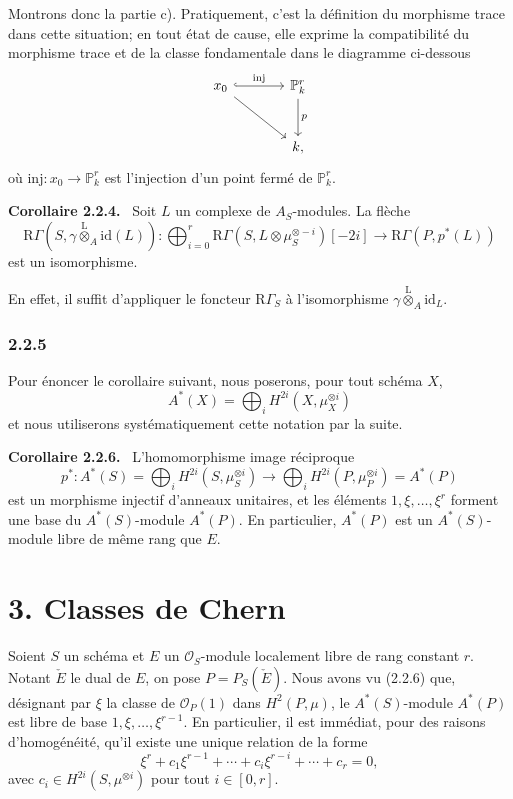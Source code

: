 \documentclass[11pt]{article}
\newenvironment{statement}[1]{\par\medskip\noindent\textbf{#1.}\ }{\par\medskip}
\providecommand{\lten}{\overset{\mathrm L}{\otimes}}
\providecommand{\lten}{\overset{\mathrm L}{\otimes}}
\providecommand{\lten}{\overset{\mathrm L}{\otimes}}
\providecommand{\lten}{\overset{\mathrm L}{\otimes}}
\providecommand{\lten}{\overset{\mathrm L}{\otimes}}
\providecommand{\lten}{\overset{\mathrm L}{\otimes}}
\providecommand{\lten}{\overset{\mathrm L}{\otimes}}
\begin{document}
Montrons donc la partie c). Pratiquement, c'est la définition du morphisme trace dans cette situation; en tout état de cause, elle exprime la compatibilité du morphisme trace et de la classe fondamentale dans le diagramme ci-dessous
\[
\begin{tikzcd}[column sep=large,row sep=large]
x_0 \arrow[r,hook,"\mathrm{inj}"] \arrow[dr] & \mathbb P^r_k \arrow[d,"p"]\\
& k ,
\end{tikzcd}
\]
où $\mathrm{inj}:x_0\to \mathbb P^r_k$ est l'injection d'un point fermé de $\mathbb P^r_k$.

\begin{statement}{Corollaire 2.2.4}
Soit $L$ un complexe de $A_S$-modules. La flèche
\[
\mathrm R\Gamma(S,\gamma\lten_A\mathrm{id}(L)):
\bigoplus_{i=0}^r \mathrm R\Gamma(S,L\otimes\mu_S^{\otimes -i})[-2i]
\longrightarrow
\mathrm R\Gamma(P,p^*(L))
\]
est un isomorphisme.
\end{statement}

En effet, il suffit d'appliquer le foncteur $\mathrm R\Gamma_S$ à l'isomorphisme $\gamma\lten_A\mathrm{id}_L$.

\subsubsection*{2.2.5}
Pour énoncer le corollaire suivant, nous poserons, pour tout schéma $X$,
\[
A^*(X)=\bigoplus_i H^{2i}(X,\mu_X^{\otimes i})
\]
et nous utiliserons systématiquement cette notation par la suite.

\begin{statement}{Corollaire 2.2.6}
L'homomorphisme image réciproque
\[
p^*:A^*(S)=\bigoplus_i H^{2i}(S,\mu_S^{\otimes i})
\longrightarrow
\bigoplus_i H^{2i}(P,\mu_P^{\otimes i})=A^*(P)
\]
est un morphisme injectif d'anneaux unitaires, et les éléments $1,\xi,\ldots,\xi^r$ forment une base du $A^*(S)$-module $A^*(P)$. En particulier, $A^*(P)$ est un $A^*(S)$-module libre de même rang que $E$.
\end{statement}

\section*{3. Classes de Chern}

Soient $S$ un schéma et $E$ un $\mathcal O_S$-module localement libre de rang constant $r$. Notant $\check E$ le dual de $E$, on pose $P=P_S(\check E)$. Nous avons vu (2.2.6) que, désignant par $\xi$ la classe de $\mathcal O_P(1)$ dans $H^2(P,\mu)$, le $A^*(S)$-module $A^*(P)$ est libre de base $1,\xi,\ldots,\xi^{r-1}$. En particulier, il est immédiat, pour des raisons d'homogénéité, qu'il existe une unique relation de la forme
\[
\xi^r+c_1\xi^{r-1}+\cdots+c_i\xi^{r-i}+\cdots+c_r=0,
\tag{3.1}
\]
avec $c_i\in H^{2i}(S,\mu^{\otimes i})$ pour tout $i\in[0,r]$.
\end{document}
